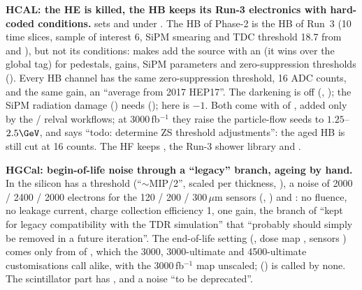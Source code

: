 \textbf{HCAL: the HE is killed, the HB keeps its Run-3 electronics with hard-coded conditions.}
 sets  and  under . The HB of Phase-2 is the HB of Run~3 (10 time slices, sample of interest 6, SiPM
smearing and TDC threshold 18.7 from  and ), but not its conditions:
 makes  add the source
 with an  (it wins over the global tag) for pedestals, gains, SiPM parameters and
zero-suppression thresholds (). Every HB
channel has the same zero-suppression threshold, 16 ADC counts, and the same gain, an ``average from 2017 HEP17''. The
darkening is off (, ); the SiPM radiation damage
() needs  (); here  is $-1$.
Both come with  of , added only by the  / 
relval workflows; at 3000\,fb$^{-1}$ they raise the particle-flow seeds to $1.25$--$2.5\GeV$, and  says
``todo: determine ZS threshold adjustments'': the aged HB is still cut at 16 counts. The HF keeps , the Run-3 shower library and .

\textbf{HGCal: begin-of-life noise through a ``legacy'' branch, ageing by hand.} In
 the silicon has a threshold  (``$\sim$MIP/2'', scaled per thickness, ), a noise of 2000 / 2400 / 2000
electrons for the 120 / 200 / 300\,$\mu$m sensors (, ) and
: no fluence, no leakage current, charge collection efficiency 1, one gain, the branch of
 ``kept for legacy compatibility with the TDR simulation'' that ``probably should
simply be removed in a future iteration''. The end-of-life setting (, dose map
, sensors ) comes only from  of
, which the 3000, 3000-ultimate and 4500-ultimate customisations call alike, with the 3000\,fb$^{-1}$ map
unscaled;  () is called by none. The scintillator part
has ,  and a noise  ``to be deprecated''.

